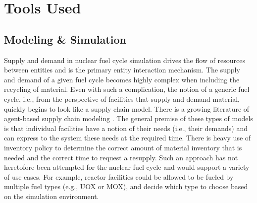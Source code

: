 
\section{Tools Used}

\subsection{Modeling \& Simulation}\label{intro:sim}

Supply and demand in nuclear fuel cycle simulation drives the flow of resources
between entities and is the primary entity interaction mechanism. The supply and
demand of a given fuel cycle becomes highly complex when including the recycling
of material. Even with such a complication, the notion of a generic fuel cycle,
i.e., from the perspective of facilities that supply and demand material,
quickly begins to look like a supply chain model. There is a growing literature
of agent-based supply chain modeling
\cite{swaminathan_modeling_1998,julka_agent-based_2002,van_der_zee_modeling_2005,chatfield_multi-formalism_2007,holmgren_agent_2007}.
The general premise of these types of models is that individual facilities have
a notion of their needs (i.e., their demands) and can express to the system
these needs at the required time. There is heavy use of inventory policy to
determine the correct amount of material inventory that is needed and the
correct time to request a resupply. Such an approach has not heretofore been
attempted for the nuclear fuel cycle and would support a variety of use
cases. For example, reactor facilities could be allowed to be fueled by multiple
fuel types (e.g., UOX or MOX), and decide which type to choose based on the
simulation environment.


